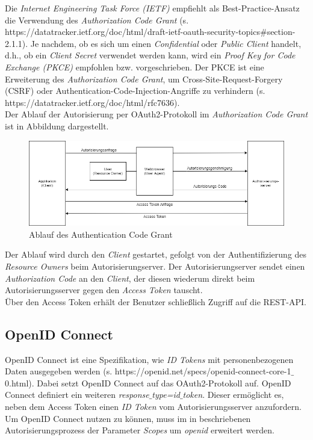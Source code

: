 Die \textit{Internet Engineering Task Force (IETF)} empfiehlt als Best-Practice-Ansatz die Verwendung des \textit{Authorization Code Grant} (s. https://datatracker.ietf.org/doc/html/draft-ietf-oauth-security-topics\#section-2.1.1). 
Je nachdem, ob es sich um einen \textit{Confidential} oder \textit{Public Client} handelt, d.h., ob ein \textit{Client Secret} verwendet werden kann, wird ein \textit{Proof Key for Code Exchange (PKCE)} empfohlen bzw. vorgeschrieben. 
Der PKCE ist eine Erweiterung des \textit{Authorization Code Grant}, um Cross-Site-Request-Forgery (CSRF) oder Authentication-Code-Injection-Angriffe zu verhindern (s. https://datatracker.ietf.org/doc/html/rfc7636). \\

Der Ablauf der Autorisierung per OAuth2-Protokoll im \textit{Authorization Code Grant} ist in Abbildung  dargestellt. 

\begin{figure}[htbp]
\centering
\includegraphics[width=\textwidth]{Authentication_Code_Grant.png}
\caption{Ablauf des Authentication Code Grant}
\label{fig:auth-code-grant}
\end{figure}

Der Ablauf wird durch den \textit{Client} gestartet, gefolgt von der Authentifizierung des \textit{Resource Owners} beim Autorisierungserver. 
Der Autorisierungserver sendet einen \textit{Authorization Code} an den \textit{Client}, der diesen wiederum direkt beim Autorisierungsserver gegen den \textit{Access Token} tauscht. \\

Über den Access Token erhält der Benutzer schließlich Zugriff auf die REST-API.

\subsection{OpenID Connect}
\label{auth:openid}

OpenID Connect ist eine Spezifikation, wie \textit{ID Tokens} mit personenbezogenen Daten ausgegeben werden (s. https://openid.net/specs/openid-connect-core-1$\_$0.html). 
Dabei setzt OpenID Connect auf das OAuth2-Protokoll auf. 
OpenID Connect definiert ein weiteren \textit{response$\_$type=id$\_$token}. 
Dieser ermöglicht es, neben dem Access Token einen \textit{ID Token} vom Autorisierungsserver anzufordern. 
Um OpenID Connect nutzen zu können, muss im in  beschriebenen Autorisierungsprozess der Parameter \textit{Scopes} um \textit{openid} erweitert werden. \\

